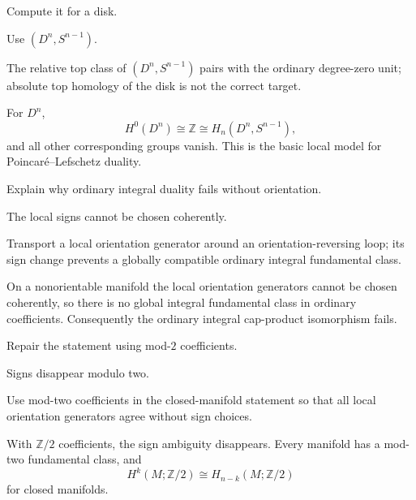 \begin{exercise}\label{exr:viii33-18}
Compute it for a disk.
\end{exercise}
\begin{hint}
Use $(D^n,S^{n-1})$.

The relative top class of \((D^n,S^{n-1})\) pairs with the ordinary degree-zero unit; absolute top homology of the disk is not the correct target.
\end{hint}
\begin{solution}
For \(D^n\),
\[
H^0(D^n)\cong\mathbb Z\cong H_n(D^n,S^{n-1}),
\]
and all other corresponding groups vanish. This is the basic local model for Poincaré--Lefschetz duality.
\end{solution}

\begin{exercise}\label{exr:viii33-19}
Explain why ordinary integral duality fails without orientation.
\end{exercise}
\begin{hint}
The local signs cannot be chosen coherently.

Transport a local orientation generator around an orientation-reversing loop; its sign change prevents a globally compatible ordinary integral fundamental class.
\end{hint}
\begin{solution}
On a nonorientable manifold the local orientation generators cannot be chosen coherently, so there is no global integral fundamental class in ordinary coefficients. Consequently the ordinary integral cap-product isomorphism fails.
\end{solution}

\begin{exercise}\label{exr:viii33-20}
Repair the statement using mod-$2$ coefficients.
\end{exercise}
\begin{hint}
Signs disappear modulo two.

Use mod-two coefficients in the closed-manifold statement so that all local orientation generators agree without sign choices.
\end{hint}
\begin{solution}
With \(\mathbb Z/2\) coefficients, the sign ambiguity disappears. Every manifold has a mod-two fundamental class, and
\[
H^k(M;\mathbb Z/2)\cong H_{n-k}(M;\mathbb Z/2)
\]
for closed manifolds.
\end{solution}

